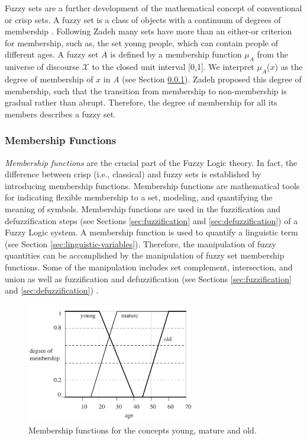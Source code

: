 \documentclass[11pt]{article}
\begin{document}
Fuzzy sets are a further development of the mathematical concept of conventional
or crisp sets. A fuzzy set is a class of objects with a continuum of degrees of
membership \cite{zadeh:fuzzy}. Following Zadeh \cite{zadeh:fuzzy} many sets have
more than an either-or criterion for membership, such as, the set young people,
which can contain people of different ages. A fuzzy set $\textit{A}$ is defined
by a membership function $\mu_A$ from the universe of discourse $\mathcal{X}$ to
the closed unit interval [0,1]. We interpret $\mu_A$($\textit{x}$) as the degree
of membership of $\textit{x}$ in \textit{A} (see Section
\ref{sec:membership-function}). Zadeh proposed this degree of membership, such
that the transition from membership to non-membership is gradual rather than
abrupt. Therefore, the degree of membership for all its members describes a
fuzzy set.

\subsubsection{Membership Functions}
\label{sec:membership-function}

\textit{Membership functions} are the crucial part of the Fuzzy Logic theory. In
fact, the difference between crisp (i.e., classical) and fuzzy sets is
established by introducing membership functions. Membership functions are
mathematical tools for indicating flexible membership to a set, modeling, and
quantifying the meaning of symbols. Membership functions are used in the
fuzzification and defuzzification steps (see Sections \ref{sec:fuzzification}
and \ref{sec:defuzzification}) of a Fuzzy Logic system. A membership function is
used to quantify a linguistic term (see Section \ref{sec:linguistic-variables}).
Therefore, the manipulation of fuzzy quantities can be accomplished by the
manipulation of fuzzy set membership functions. Some of the manipulation
includes set complement, intersection, and union as well as fuzzification and
defuzzification (see Sections \ref{sec:fuzzification} and
\ref{sec:defuzzification}) \cite{schalkoff:intelligent-systems}.

\begin{figure}[tbh]
  \center
  \includegraphics[width=0.65\textwidth]{figure/membership-function.png}
  \caption{Membership functions for the concepts young, mature and old.}
  \label{fig:membership-function}
\end{figure}
\end{document}
